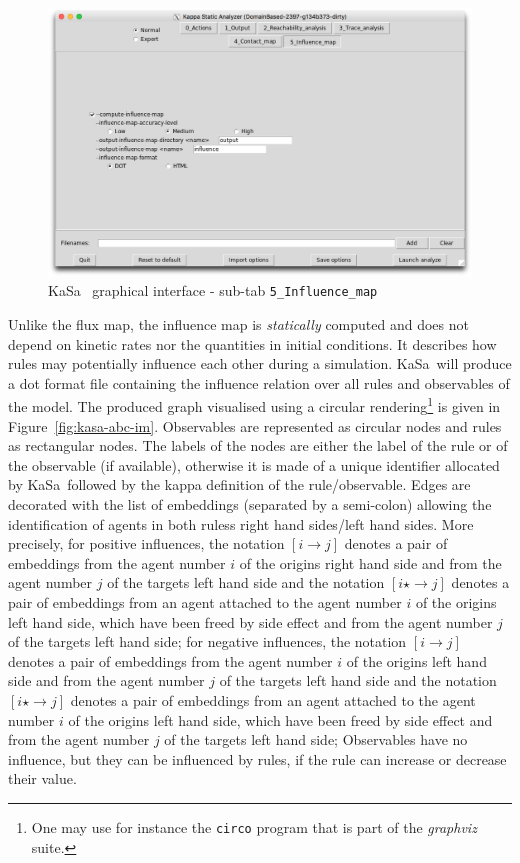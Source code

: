 \documentclass[11pt]{book}
\def\KaSa{\textsf{KaSa}}
\def\ttt#1{\texttt{#1}}
\def\rar{\rightarrow}
\begin{document}
\begin{figure}[htbp]
\centering
\includegraphics[width=12cm,bb=0 0 1904 1208]{img/kasa_5.png}
\caption{\KaSa~ graphical interface - sub-tab \texttt{5\_Influence\_map}}
\label{fig:kasa:4}
\end{figure}

Unlike the flux map, the influence map is \emph{statically} computed and does not depend on kinetic rates nor the quantities in initial conditions. It describes how rules may potentially influence each other during a simulation. \KaSa~will produce a dot format file containing the influence relation over all rules and observables of the model. The produced graph visualised using a circular rendering\footnote{One may use for instance the \ttt{circo} program that is part of the \textit{graphviz} suite.} is given in Figure~\ref{fig:kasa-abc-im}. Observables are represented as circular nodes and rules as rectangular nodes. The labels of the nodes are either the label of the rule or of the observable (if available), otherwise it is made of a unique identifier allocated by \KaSa~followed by the kappa definition of the rule/observable.
Edges are decorated with the list of embeddings (separated by a semi-colon) allowing the identification of agents in both rules{\textquotesingle}s right hand sides/left hand sides.
More precisely, for positive influences,  the notation $[i\rar j]$ denotes a pair of embeddings from the agent number $i$ of the origin{\textquotesingle}s right hand side and from the agent number $j$ of the target{\textquotesingle}s left hand side and the notation $[i\star \rar j]$ denotes a pair of embeddings from an agent attached to the agent number $i$  of the origin{\textquotesingle}s left hand side, which have been freed by side effect  and   from the agent number $j$ of the target{\textquotesingle}s left hand side; for negative influences,  the notation $[i\rar j]$ denotes a pair of embeddings from the agent number $i$ of the origin{\textquotesingle}s left hand side and from the agent number $j$ of the target{\textquotesingle}s left hand side and the notation $[i\star \rar j]$ denotes a pair of embeddings from an agent attached to the agent number $i$  of the origin{\textquotesingle}s left hand side, which have been freed by side effect  and   from the agent number $j$ of the target{\textquotesingle}s left hand side;
 Observables have no influence, but they can be influenced by rules, if the rule can increase or decrease their value.
\end{document}
